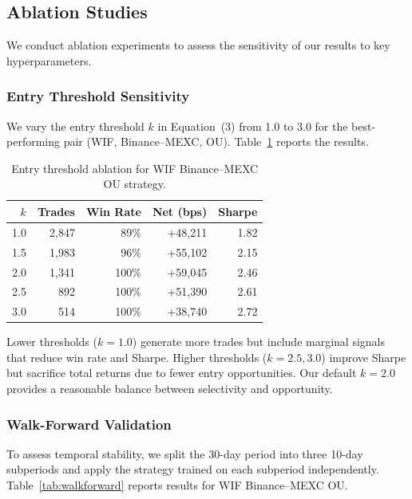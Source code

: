 \documentclass[sigconf,nonacm=false]{acmart}
\begin{document}
\subsection{Ablation Studies}\label{sec:ablation}

We conduct ablation experiments to assess the sensitivity of our results to key hyperparameters.

\subsubsection{Entry Threshold Sensitivity}

We vary the entry threshold $k$ in Equation~(3) from 1.0 to 3.0 for the best-performing pair (WIF, Binance--MEXC, OU). Table~\ref{tab:ablation_k} reports the results.

\begin{table}[h]
\caption{Entry threshold ablation for WIF Binance--MEXC OU strategy.}
\label{tab:ablation_k}
\begin{tabular}{rrrrr}
\toprule
$k$ & \textbf{Trades} & \textbf{Win Rate} & \textbf{Net (bps)} & \textbf{Sharpe} \\
\midrule
1.0 & 2,847 & 89\% & +48,211 & 1.82 \\
1.5 & 1,983 & 96\% & +55,102 & 2.15 \\
2.0 & 1,341 & 100\% & +59,045 & 2.46 \\
2.5 & 892  & 100\% & +51,390 & 2.61 \\
3.0 & 514  & 100\% & +38,740 & 2.72 \\
\bottomrule
\end{tabular}
\end{table}

Lower thresholds ($k=1.0$) generate more trades but include marginal signals that reduce win rate and Sharpe. Higher thresholds ($k=2.5, 3.0$) improve Sharpe but sacrifice total returns due to fewer entry opportunities. Our default $k=2.0$ provides a reasonable balance between selectivity and opportunity.

\subsubsection{Walk-Forward Validation}

To assess temporal stability, we split the 30-day period into three 10-day subperiods and apply the strategy trained on each subperiod independently. Table~\ref{tab:walkforward} reports results for WIF Binance--MEXC OU.
\end{document}
